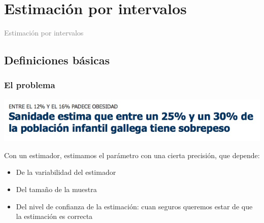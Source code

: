 \documentclass[12pt,t]{beamer}\usepackage[]{graphicx}\usepackage[]{color}
\title[\red{Matemáticas III GINF}]{}
\author[]{}
\date{}
\newcommand{\gray}[1]{\textcolor{gray}{#1}}
\renewcommand{\emph}[1]{{\color{red}#1}}
\theoremstyle{plain}
\theoremstyle{definition}
\begin{document}
\beamertemplatedotitem

\lstset{breaklines=true}
\lstset{basicstyle=\ttfamily}


\section{Estimación por intervalos}

\begin{frame}
\vfill
\begin{center}
\gray{\LARGE Estimación por intervalos}
\end{center}
\vfill
\end{frame}


\subsection{Definiciones básicas}

\begin{frame}
\frametitle{El problema}
\vspace*{-1cm}

\begin{center}
\hspace*{-0.6cm}
\includegraphics[width=1.1\linewidth]{sanidade}
\end{center}
\vspace*{-1ex}

Con un estimador, estimamos el parámetro con una cierta precisión, que depende:
\medskip

\begin{itemize}
\item De la variabilidad del estimador
\medskip

\item Del tamaño de la muestra
\medskip

\item Del \emph{nivel de confianza} de la  estimación: cuan seguros  queremos estar de que la estimación es correcta
\end{itemize}
\end{frame}
\end{document}
